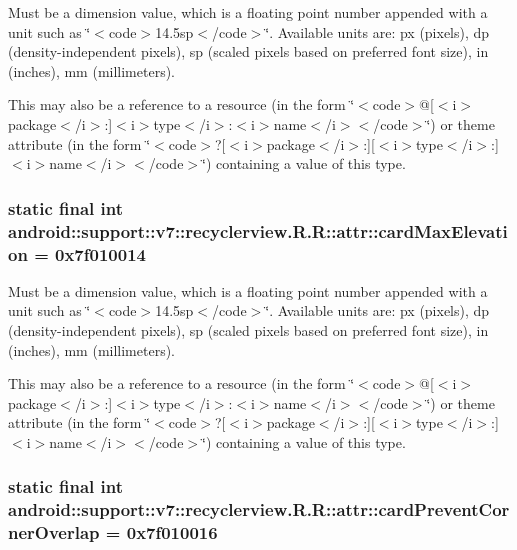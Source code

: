 Must be a dimension value, which is a floating point number appended with a unit such as \char`\"{}$<$code$>$14.5sp$<$/code$>$\char`\"{}. Available units are: px (pixels), dp (density-independent pixels), sp (scaled pixels based on preferred font size), in (inches), mm (millimeters). 

This may also be a reference to a resource (in the form \char`\"{}$<$code$>$@\mbox{[}$<$i$>$package$<$/i$>$:\mbox{]}$<$i$>$type$<$/i$>$:$<$i$>$name$<$/i$>$$<$/code$>$\char`\"{}) or theme attribute (in the form \char`\"{}$<$code$>$?\mbox{[}$<$i$>$package$<$/i$>$:\mbox{]}\mbox{[}$<$i$>$type$<$/i$>$:\mbox{]}$<$i$>$name$<$/i$>$$<$/code$>$\char`\"{}) containing a value of this type. \hypertarget{classandroid_1_1support_1_1v7_1_1recyclerview_1_1_r_1_1attr_e709df9e3c1a3e38a5790b824a431225}{
\subsubsection[{cardMaxElevation}]{\setlength{\rightskip}{0pt plus 5cm}static final int android::support::v7::recyclerview.R.R::attr::cardMaxElevation = 0x7f010014}}
\label{classandroid_1_1support_1_1v7_1_1recyclerview_1_1_r_1_1attr_e709df9e3c1a3e38a5790b824a431225}


Must be a dimension value, which is a floating point number appended with a unit such as \char`\"{}$<$code$>$14.5sp$<$/code$>$\char`\"{}. Available units are: px (pixels), dp (density-independent pixels), sp (scaled pixels based on preferred font size), in (inches), mm (millimeters). 

This may also be a reference to a resource (in the form \char`\"{}$<$code$>$@\mbox{[}$<$i$>$package$<$/i$>$:\mbox{]}$<$i$>$type$<$/i$>$:$<$i$>$name$<$/i$>$$<$/code$>$\char`\"{}) or theme attribute (in the form \char`\"{}$<$code$>$?\mbox{[}$<$i$>$package$<$/i$>$:\mbox{]}\mbox{[}$<$i$>$type$<$/i$>$:\mbox{]}$<$i$>$name$<$/i$>$$<$/code$>$\char`\"{}) containing a value of this type. \hypertarget{classandroid_1_1support_1_1v7_1_1recyclerview_1_1_r_1_1attr_ee0cce36e845e4488999245b863ea517}{
\subsubsection[{cardPreventCornerOverlap}]{\setlength{\rightskip}{0pt plus 5cm}static final int android::support::v7::recyclerview.R.R::attr::cardPreventCornerOverlap = 0x7f010016}}
\label{classandroid_1_1support_1_1v7_1_1recyclerview_1_1_r_1_1attr_ee0cce36e845e4488999245b863ea517}


